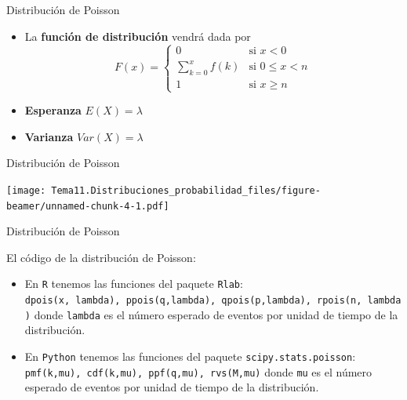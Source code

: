 \documentclass[
  ignorenonframetext,
]{beamer}
\providecommand{\tightlist}{%
  \setlength{\itemsep}{0pt}\setlength{\parskip}{0pt}}
\begin{document}
\begin{frame}{Distribución de Poisson}
\protect\hypertarget{distribuciuxf3n-de-poisson-1}{}

\begin{itemize}
\tightlist
\item
  La \textbf{función de distribución} vendrá dada por \[F(x) = \left\{
  \begin{array}{cl}
     0 & \text{si } x<0 
  \\ \sum_{k=0}^xf(k) & \text{si } 0\le x<n
  \\ 1 & \text{si } x\ge n
  \end{array}
  \right.\]
\item
  \textbf{Esperanza} \(E(X) = \lambda\)
\item
  \textbf{Varianza} \(Var(X) = \lambda\)
\end{itemize}

\end{frame}

\begin{frame}{Distribución de Poisson}
\protect\hypertarget{distribuciuxf3n-de-poisson-2}{}

\texttt{[image: Tema11.Distribuciones\_probabilidad\_files/figure-beamer/unnamed-chunk-4-1.pdf]}

\end{frame}

\begin{frame}[fragile]{Distribución de Poisson}
\protect\hypertarget{distribuciuxf3n-de-poisson-3}{}

El código de la distribución de Poisson:

\begin{itemize}
\tightlist
\item
  En \texttt{R} tenemos las funciones del paquete \texttt{Rlab}:
  \texttt{dpois(x,\ lambda),\ ppois(q,lambda),\ qpois(p,lambda),\ rpois(n,\ lambda)}
  donde \texttt{lambda} es el número esperado de eventos por unidad de
  tiempo de la distribución.
\item
  En \texttt{Python} tenemos las funciones del paquete
  \texttt{scipy.stats.poisson}:
  \texttt{pmf(k,mu),\ cdf(k,mu),\ ppf(q,mu),\ rvs(M,mu)} donde
  \texttt{mu} es el número esperado de eventos por unidad de tiempo de
  la distribución.
\end{itemize}

\end{frame}
\end{document}

